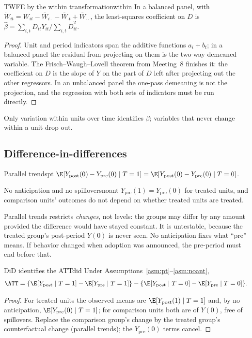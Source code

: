 \documentclass[11pt]{article}
\begin{document}
\begin{prop}{TWFE by the within transformation}{within}
In a balanced panel, with $\ddot W_{it} = W_{it} - \bar W_{i\cdot} - \bar W_{\cdot t} + \bar W_{\cdot\cdot}$, the least-squares coefficient on $D$ is
$\hat\beta = \sum_{i,t}\ddot D_{it}Y_{it}/\sum_{i,t}\ddot D_{it}^2$.
\end{prop}
\begin{proof}
Unit and period indicators span the additive functions $a_i + b_t$; in a balanced panel the residual from projecting on them is the
two-way demeaned variable. The Frisch--Waugh--Lovell theorem from Meeting~8 finishes it: the coefficient on $D$ is the slope of $Y$
on the part of $D$ left after projecting out the other regressors. In an unbalanced panel the one-pass demeaning is not the
projection, and the regression with both sets of indicators must be run directly.
\end{proof}

Only variation within units over time identifies $\beta$; variables that never change within a unit drop out.

\subsection{Difference-in-differences}

\begin{assum}{Parallel trends}{pt}
$\E[Y_{\text{post}}(0) - Y_{\text{pre}}(0) \mid T=1] = \E[Y_{\text{post}}(0) - Y_{\text{pre}}(0) \mid T=0]$.
\end{assum}
\begin{assum}{No anticipation and no spillovers}{noant}
$Y_{\text{pre}}(1) = Y_{\text{pre}}(0)$ for treated units, and comparison units' outcomes do not depend on whether treated units are treated.
\end{assum}

Parallel trends restricts \emph{changes}, not levels: the groups may differ by any amount provided the difference would have stayed constant.
It is untestable, because the treated group's post-period $Y(0)$ is never seen. No anticipation fixes what ``pre'' means. If behavior changed
when adoption was announced, the pre-period must end before that.

\begin{prop}{DiD identifies the ATT}{did}
Under Assumptions~\ref{asm:pt}--\ref{asm:noant},
\[
  \ATT = \{\E[Y_{\text{post}} \mid T=1] - \E[Y_{\text{pre}} \mid T=1]\} - \{\E[Y_{\text{post}} \mid T=0] - \E[Y_{\text{pre}} \mid T=0]\}.
\]
\end{prop}
\begin{proof}
For treated units the observed means are $\E[Y_{\text{post}}(1) \mid T=1]$ and, by no anticipation, $\E[Y_{\text{pre}}(0) \mid T=1]$; for comparison units
both are of $Y(0)$, free of spillovers. Replace the comparison group's change by the treated group's counterfactual change (parallel trends);
the $Y_{\text{pre}}(0)$ terms cancel.
\end{proof}
\end{document}

